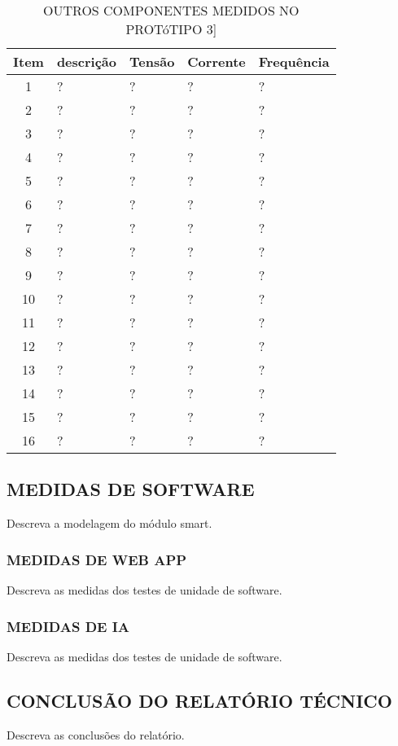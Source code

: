 \begin{table}
	\centering
	\caption{OUTROS COMPONENTES MEDIDOS NO PROTóTIPO 3]}
	\begin{tabular}{ |c | p{3cm}| p{3cm} |p{3cm} | p{3cm} | } \hline
		\textbf{ Item} 	   & \textbf{descrição}	&\textbf{Tensão} &\textbf{Corrente} &\textbf{Frequência} \\ \hline
		1  & ? & ? & ? & ? \\ \hline
		2  & ? & ? & ? & ? \\ \hline
		3  & ? & ? & ? & ? \\ \hline
		4  & ? & ? & ? & ? \\ \hline
		5  & ? & ? & ? & ?\\ \hline
		6  & ? & ? & ? & ?\\ \hline
		7  & ? & ? & ? & ?\\ \hline
		8  & ? & ? & ? & ?\\ \hline
		9  & ? & ? & ? & ?\\ \hline
		10  & ? & ? & ? & ?\\ \hline
		11 & ? & ? & ? & ?\\ \hline
		12 & ? & ? & ? & ?\\ \hline
		13 & ? & ? & ? & ?\\ \hline
		14 & ? & ? & ? & ?\\ \hline
		15 & ? & ? & ? & ?\\ \hline
		16 & ? & ? & ? & ?\\ \hline
		
		
	\end{tabular}					
	
	
	\label{T15}\par
\end{table}



\subsection{MEDIDAS DE SOFTWARE}
Descreva a modelagem do módulo smart.


\subsubsection{MEDIDAS DE WEB APP}
Descreva as medidas dos testes de unidade de software.

\subsubsection{MEDIDAS DE IA}
Descreva as medidas dos testes de unidade de software.


\subsection{CONCLUSÃO DO RELATÓRIO TÉCNICO}
Descreva as conclusões do relatório.


